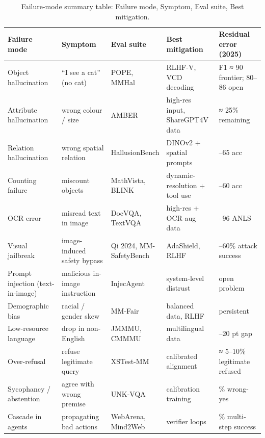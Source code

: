 \documentclass{article}
\begin{document}
\begin{table}[t]
\centering
\caption{Failure-mode summary table: Failure mode, Symptom, Eval suite, Best mitigation.}
\label{tab:failure-mode-summary-table}
\begin{tabular}{>{\raggedright\arraybackslash}p{0.2222\linewidth}
  >{\raggedright\arraybackslash}p{0.2083\linewidth}
  >{\raggedright\arraybackslash}p{0.1597\linewidth}
  >{\raggedright\arraybackslash}p{0.2153\linewidth}
  >{\raggedright\arraybackslash}p{0.1944\linewidth}}
\toprule
\textbf{Failure mode} & \textbf{Symptom} & \textbf{Eval suite} & \textbf{Best mitigation} & \textbf{Residual error (2025)} \\
\midrule
Object hallucination & ``I see a cat'' (no cat) & POPE, MMHal & RLHF-V, VCD decoding & F1 ≈ 90 frontier; 80--86 open \\
Attribute hallucination & wrong colour / size & AMBER & high-res input, ShareGPT4V data & ≈ 25\% remaining \\
Relation hallucination & wrong spatial relation & HallusionBench & DINOv2 + spatial prompts & 50--65 acc \\
Counting failure & miscount objects & MathVista, BLINK & dynamic-resolution + tool use & 40--60 acc \\
OCR error & misread text in image & DocVQA, TextVQA & high-res + OCR-aug data & 88--96 ANLS \\
Visual jailbreak & image-induced safety bypass & Qi 2024, MM-SafetyBench & AdaShield, RLHF & 30--60\% attack success \\
Prompt injection (text-in-image) & malicious in-image instruction & InjecAgent & system-level distrust & open problem \\
Demographic bias & racial / gender skew & MM-Fair & balanced data, RLHF & persistent \\
Low-resource language & drop in non-English & JMMMU, CMMMU & multilingual data & 10--20 pt gap \\
Over-refusal & refuse legitimate query & XSTest-MM & calibrated alignment & ≈ 5--10\% legitimate refused \\
Sycophancy / abstention & agree with wrong premise & UNK-VQA & calibration training & 22\% wrong-yes \\
Cascade in agents & propagating bad actions & WebArena, Mind2Web & verifier loops & 40\% multi-step success \\
\end{tabular}
\end{table}
\end{document}
